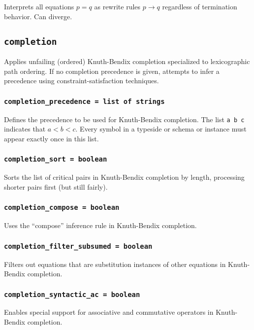 \documentclass[10pt]{book}
\begin{document}
Interprets all equations $p = q$ as rewrite rules $p \to q$ regardless of termination behavior.  Can diverge.

\subsection{{\tt completion}}

Applies unfailing (ordered) Knuth-Bendix completion specialized to lexicographic path ordering.  If no completion precedence is given, attempts to infer a precedence using constraint-satisfaction techniques.

\subsubsection{{\tt completion\_precedence = list of strings}}

Defines the precedence to be used for Knuth-Bendix completion.  The list {\tt a b c} indicates that $a < b < c$.  Every symbol in a typeside or schema or instance must appear exactly once in this list.

\subsubsection{{\tt completion\_sort = boolean}}

Sorts the list of critical pairs in Knuth-Bendix completion by length, processing shorter pairs first (but still fairly).

\subsubsection{{\tt completion\_compose = boolean}}

Uses the ``compose'' inference rule in Knuth-Bendix completion.

\subsubsection{{\tt completion\_filter\_subsumed = boolean}}

Filters out equations that are substitution instances of other equations in Knuth-Bendix completion.

\subsubsection{{\tt completion\_syntactic\_ac = boolean}}

Enables special support for associative and commutative operators in Knuth-Bendix completion.
\end{document}
